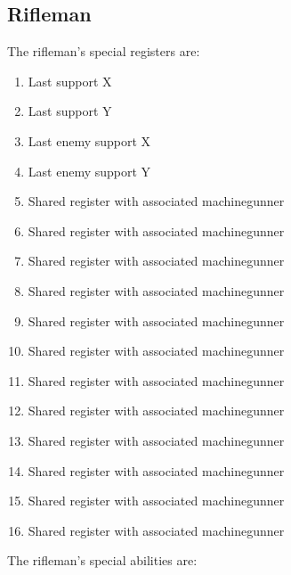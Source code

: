 \documentclass{article}
\begin{document}
\subsection*{Rifleman}

The rifleman's special registers are:

\begin{enumerate}[noitemsep]
    \item Last support X
    \item Last support Y
    \item Last enemy support X
    \item Last enemy support Y
    \item Shared register with associated machinegunner
    \item Shared register with associated machinegunner
    \item Shared register with associated machinegunner
    \item Shared register with associated machinegunner
    \item Shared register with associated machinegunner
    \item Shared register with associated machinegunner
    \item Shared register with associated machinegunner
    \item Shared register with associated machinegunner
    \item Shared register with associated machinegunner
    \item Shared register with associated machinegunner
    \item Shared register with associated machinegunner
    \item Shared register with associated machinegunner
\end{enumerate}

The rifleman's special abilities are:
\end{document}
